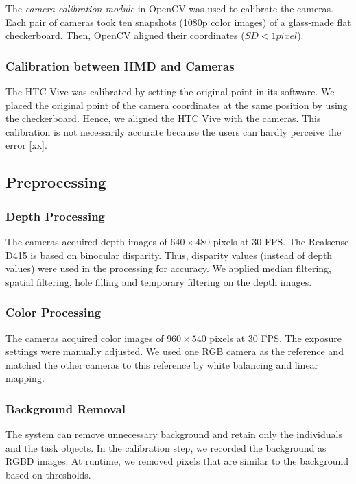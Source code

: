 The \emph{camera calibration module} in OpenCV was used to calibrate the cameras. Each pair of cameras took ten snapshots (1080p color images) of a glass-made flat checkerboard. Then, OpenCV aligned their coordinates ($SD < 1 pixel$).

\subsubsection{Calibration between HMD and Cameras}

The HTC Vive was calibrated by setting the original point in its software. We placed the original point of the camera coordinates at the same position by using the checkerboard. Hence, we aligned the HTC Vive with the cameras. This calibration is not necessarily accurate because the users can hardly perceive the error [xx].

\subsection{Preprocessing}

\subsubsection{Depth Processing}

The cameras acquired depth images of $640 \times 480$ pixels at 30 FPS. The Realsense D415 is based on binocular disparity. Thus, disparity values (instead of depth values) were used in the processing for accuracy. We applied median filtering, spatial filtering, hole filling and temporary filtering on the depth images.

\subsubsection{Color Processing}

The cameras acquired color images of $960 \times 540$ pixels at 30 FPS. The exposure settings were manually adjusted. We used one RGB camera as the reference and matched the other cameras to this reference by white balancing and linear mapping.

\subsubsection{Background Removal}

The system can remove unnecessary background and retain only the individuals and the task objects. In the calibration step, we recorded the background as RGBD images. At runtime, we removed pixels that are similar to the background based on thresholds.

